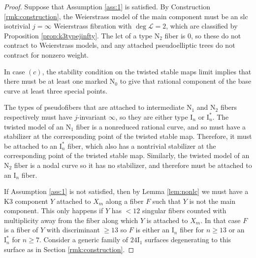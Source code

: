 \documentclass[11pt]{amsart}
\theoremstyle{definition}
\theoremstyle{remark}
\begin{document}
	\begin{proof} Suppose that Assumption \ref{ass:1} is satisfied. By Construction \ref{rmk:construction}, the Weierstrass model of the main component must be an slc isotrivial $j = \infty$ Weierstrass fibration with $\deg \mathscr{L} = 2$, which are classified by Proposition \ref{prop:k3typejinfty}. The lct of a type $\mathrm{N}_2$ fiber is $0$, so these do not contract to Weierstrass models, and any attached pseudoelliptic trees do not contract for nonzero weight. 
		
		In case $(c)$, the stability condition on the twisted stable maps limit implies that there must be at least one marked $\mathrm{N}_0$ to give that rational component of the base curve at least three special points. 
		
		The types of pseudofibers that are attached to intermediate $\mathrm{N}_1$ and $\mathrm{N}_2$ fibers respectively must have $j$-invariant $\infty$, so they are either type $\mathrm{I}_n$ or $\mathrm{I}_n^*$. The twisted model of an $\mathrm{N}_1$ fiber is a nonreduced rational curve, and so must have a stabilizer at the corresponding point of the twisted stable map. Therefore, it must be attached to an $\mathrm{I}_n^*$ fiber, which also has a nontrivial stabilizer at the corresponding point of the twisted stable map. Similarly, the twisted model of an $\mathrm{N}_2$ fiber is a nodal curve so it has no stabilizer, and therefore must be attached to an $\mathrm{I}_n$ fiber. 
		
		If Assumption \ref{ass:1} is not satisfied, then by Lemma \ref{lem:nonlc} we must have a K3 component $Y$ attached to $X_m$ along a fiber $F$ such that $Y$ is not the main component. This only happens if $Y$ has $<12$ singular fibers counted with multiplicity away from the fiber along which $Y$ is attached to $X_m$. In that case $F$ is a fiber of $Y$ with discriminant  $\geq 13$ so $F$ is either an $\mathrm{I}_n$ fiber for $n \geq 13$ or an $\mathrm{I}_n^*$ for $n \geq 7$. Consider a generic family of $24\mathrm{I}_1$ surfaces degenerating to this surface as in Section \ref{rmk:construction}.
		

\end{proof}
\end{document}
